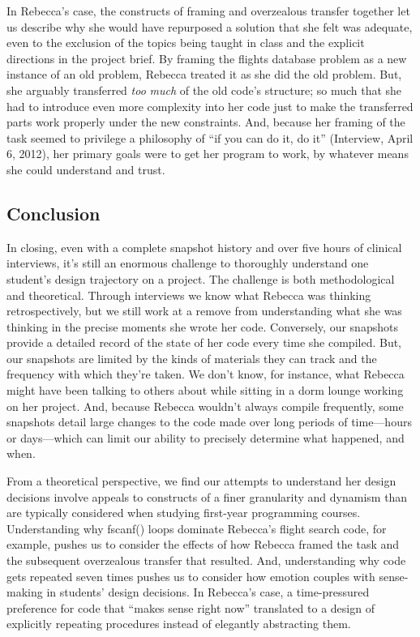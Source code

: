In Rebecca's case, the constructs of framing and overzealous transfer
together let us describe why she would have repurposed a solution that
she felt was adequate, even to the exclusion of the topics being taught
in class and the explicit directions in the project brief. By framing
the flights database problem as a new instance of an old problem,
Rebecca treated it as she did the old problem. But, she arguably
transferred \emph{too} \emph{much} of the old code's structure; so much
that she had to introduce even more complexity into her code just to
make the transferred parts work properly under the new constraints. And,
because her framing of the task seemed to privilege a philosophy of ``if
you can do it, do it'' (Interview, April 6, 2012), her primary goals
were to get her program to work, by whatever means she could understand
and trust.

\subsection{Conclusion }\label{conclusion}

In closing, even with a complete snapshot history and over five hours of
clinical interviews, it's still an enormous challenge to thoroughly
understand one student's design trajectory on a project. The challenge
is both methodological and theoretical. Through interviews we know what
Rebecca was thinking retrospectively, but we still work at a remove from
understanding what she was thinking in the precise moments she wrote her
code. Conversely, our snapshots provide a detailed record of the state
of her code every time she compiled. But, our snapshots are limited by
the kinds of materials they can track and the frequency with which
they're taken. We don't know, for instance, what Rebecca might have been
talking to others about while sitting in a dorm lounge working on her
project. And, because Rebecca wouldn't always compile frequently, some
snapshots detail large changes to the code made over long periods of
time---hours or days---which can limit our ability to precisely
determine what happened, and when.

From a theoretical perspective, we find our attempts to understand her
design decisions involve appeals to constructs of a finer granularity
and dynamism than are typically considered when studying first-year
programming courses. Understanding why fscanf() loops dominate Rebecca's
flight search code, for example, pushes us to consider the effects of
how Rebecca framed the task and the subsequent overzealous transfer that
resulted. And, understanding why code gets repeated seven times pushes
us to consider how emotion couples with sense-making in students' design
decisions. In Rebecca's case, a time-pressured preference for code that
``makes sense right now'' translated to a design of explicitly repeating
procedures instead of elegantly abstracting them.

